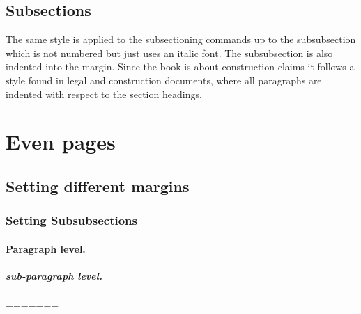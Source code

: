 \subsection{Subsections}
The same style is applied to the subsectioning commands up to the subsubsection which is not numbered but just uses an italic font. The subsubsection is also indented into the margin. Since the book is about construction claims it follows a style found in legal and construction documents, where all paragraphs are indented with respect to the section headings.
\lipsum[1-2]
\section{Even pages}
\lipsum[2]
\subsection{Setting different margins}
\lipsum[1]
\subsubsection{Setting Subsubsections}
\lipsum[1]
\paragraph{Paragraph level. } \lipsum*[3]\par

\lipsum[1]
\subparagraph{sub-paragraph level. } \lipsum*[3]\par


\restoregeometry
=======
\setcounter{secnumdepth}{6}

